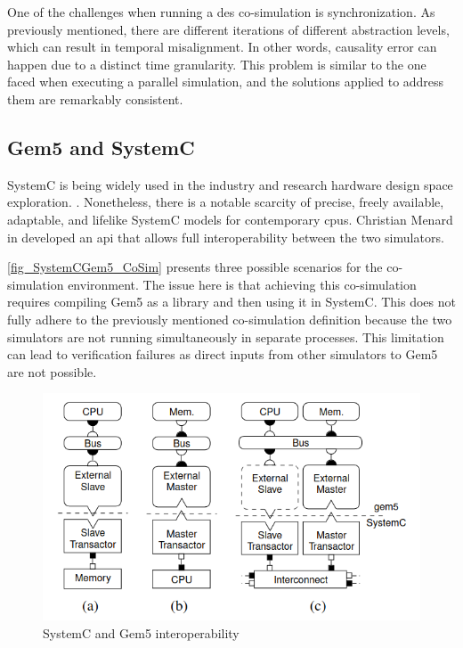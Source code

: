 One of the challenges when running a \gls{des} co-simulation is synchronization. As previously mentioned, there are different 
iterations of different abstraction levels, which can result in temporal misalignment. In other words, causality error can happen due to a 
distinct time granularity. This problem is similar to the one faced when executing a parallel simulation, and the solutions applied to address 
them are remarkably consistent. 


\subsection{Gem5 and SystemC}

SystemC is being widely used in the industry and research hardware design space exploration. \cite{menard2017system}. Nonetheless, there 
is a notable scarcity of precise, freely available, adaptable, and lifelike SystemC models for contemporary \glspl{cpu}. Christian Menard 
in \cite{menard2017system} developed an \gls{api} that allows full interoperability between the two simulators. 

\autoref{fig_SystemCGem5_CoSim} presents three possible scenarios for the co-simulation environment. The issue here is that achieving 
this co-simulation requires compiling Gem5 as a library and then using it in SystemC. This does not fully adhere to the previously mentioned 
co-simulation definition because the two simulators are not running simultaneously in separate processes. This limitation can lead to 
verification failures as direct inputs from other simulators to Gem5 are not possible.

\begin{figure}[H]
	\centering
 	\includegraphics[width=0.7\linewidth]{Images/SystemCGem5_CoSim.png}
 	\caption{SystemC and Gem5 interoperability \cite{menard2017system}}
	 \label{fig_SystemCGem5_CoSim}
\end{figure}

